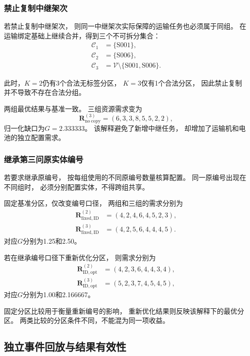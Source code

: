 \documentclass[bwprint]{gmcmthesis}
\begin{document}
\subsubsection{禁止复制中继架次}

若禁止复制中继架次，
则同一中继架次实际保障的运输任务也必须属于同组。
在运输绑定基础上继续合并，得到三个不可拆分集合：
\begin{align}
\mathcal{C}_1&=\{\mathrm{S001}\},\\
\mathcal{C}_2&=\{\mathrm{S006}\},\\
\mathcal{C}_3&=\mathcal{V}
\setminus\{\mathrm{S001},\mathrm{S006}\}.
\end{align}

此时，$K=2$仍有3个合法无标签分区，
$K=3$仅有1个合法分区，
因此禁止复制并不导致不存在合法分组。

两组最优结果与基准一致。
三组资源需求变为
\begin{equation}
\boldsymbol{R}^{(3)}_{\mathrm{no\ copy}}
=(6,3,3,8,5,5,2,2),
\end{equation}
归一化缺口为$G=2.333333$。
该解释避免了新增中继任务，
却增加了运输机和电池的独立配置需求。

\subsubsection{继承第三问原实体编号}

若要求继承原编号，
按每组使用的不同原编号数量核算配置。
同一原编号出现在不同组时，
必须分别配置实体，不得跨组共享。

固定基准分区，仅改变编号口径，
两组和三组的需求分别为
\begin{align}
\boldsymbol{R}^{(2)}_{\mathrm{fixed,ID}}
&=(4,2,4,6,4,5,2,3),\\
\boldsymbol{R}^{(3)}_{\mathrm{fixed,ID}}
&=(4,2,5,6,4,4,4,5).
\end{align}
对应$G$分别为1.25和2.50。

若在继承编号口径下重新优化分区，
则需求分别为
\begin{align}
\boldsymbol{R}^{(2)}_{\mathrm{ID,opt}}
&=(4,2,3,6,4,4,3,4),\\
\boldsymbol{R}^{(3)}_{\mathrm{ID,opt}}
&=(5,2,3,7,4,5,4,5),
\end{align}
对应$G$分别为1.00和2.166667。

固定分区比较用于衡量重新编号的影响，
重新优化结果则反映该解释下的最优分区。
两类比较的分区条件不同，不能混为同一项收益。

\subsection{独立事件回放与结果有效性}
\end{document}
